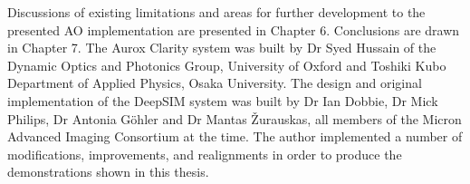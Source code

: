 Discussions of existing limitations and areas for further development to the 
presented AO implementation are presented in Chapter 6. Conclusions are drawn 
in Chapter 7. The Aurox Clarity system was built by Dr Syed Hussain of the 
Dynamic Optics and Photonics Group, University of Oxford and Toshiki Kubo
Department of Applied Physics, Osaka University. The design and original 
implementation of the DeepSIM system was built by Dr Ian Dobbie, Dr Mick 
Philips, Dr Antonia G\"{o}hler and Dr Mantas \v{Z}urauskas, 
all members of the Micron Advanced Imaging Consortium at the time. The author 
implemented a number of modifications, improvements, and realignments in 
order to produce the demonstrations shown in this thesis.